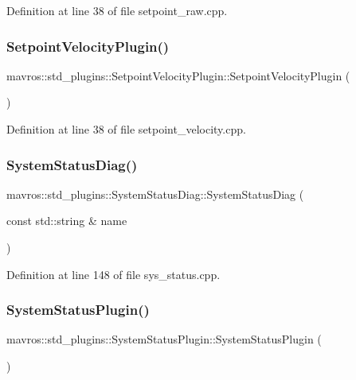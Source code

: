 Definition at line 38 of file setpoint\+\_\+raw.\+cpp.

\mbox{\label{group__plugin_ga9baa508ff9d450a25c0a0f46067bc6c0}} 
\subsubsection{\texorpdfstring{SetpointVelocityPlugin()}{SetpointVelocityPlugin()}}
{\footnotesize\ttfamily mavros\+::std\+\_\+plugins\+::\+Setpoint\+Velocity\+Plugin\+::\+Setpoint\+Velocity\+Plugin (\begin{DoxyParamCaption}{ }\end{DoxyParamCaption})\hspace{0.3cm}{\ttfamily [inline]}}



Definition at line 38 of file setpoint\+\_\+velocity.\+cpp.

\mbox{\label{group__plugin_ga8a20cabc2080762291d761bb2cbcdc67}} 
\subsubsection{\texorpdfstring{SystemStatusDiag()}{SystemStatusDiag()}}
{\footnotesize\ttfamily mavros\+::std\+\_\+plugins\+::\+System\+Status\+Diag\+::\+System\+Status\+Diag (\begin{DoxyParamCaption}\item[{const std\+::string \&}]{name }\end{DoxyParamCaption})\hspace{0.3cm}{\ttfamily [inline]}}



Definition at line 148 of file sys\+\_\+status.\+cpp.

\mbox{\label{group__plugin_ga93652f33205dc610638618b43a6addbc}} 
\subsubsection{\texorpdfstring{SystemStatusPlugin()}{SystemStatusPlugin()}}
{\footnotesize\ttfamily mavros\+::std\+\_\+plugins\+::\+System\+Status\+Plugin\+::\+System\+Status\+Plugin (\begin{DoxyParamCaption}{ }\end{DoxyParamCaption})\hspace{0.3cm}{\ttfamily [inline]}}




